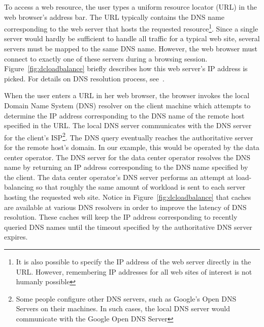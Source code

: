 To access a web resource, the user types a uniform resource locator (URL) in the web browser's address bar. The URL typically contains the DNS name corresponding to the web server that hosts the requested resource\footnote{It is also possible to specify the IP address of the web server directly in the URL. However, remembering IP addresses for all web sites of interest is not humanly possible}. Since a single server would hardly be sufficient to handle all traffic for a typical web site, several servers must be mapped to the same DNS name. However, the web browser must connect to exactly one of these servers during a browsing session. Figure~\ref{fig:dcloadbalance} briefly describes how this web server's IP address is picked. For details on DNS resolution process, see~\cite{rfc1034,rfc1035}. 

When the user enters a URL in her web browser, the browser invokes the local Domain Name System (DNS) resolver on the client machine which attempts to determine the IP address corresponding to the DNS name of the remote host specified in the URL. The local DNS server communicates with the DNS server for the client's ISP\footnote{Some people configure other DNS servers, such as Google's Open DNS Servers on their machines. In such cases, the local DNS server would communicate with the Google Open DNS Server}. The DNS query eventually reaches the authoritative server for the remote host's domain. In our example, this would be operated by the data center operator. The DNS server for the data center operator resolves the DNS name by returning an IP address corresponding to the DNS name specified by the client. The data center operator's DNS server performs an attempt at load-balancing so that roughly the same amount of workload is sent to each server hosting the requested web site. Notice in Figure~\ref{fig:dcloadbalance} that caches are available at various DNS resolvers in order to improve the latency of DNS resolution. These caches will keep the IP address corresponding to recently queried DNS names until the timeout specified by the authoritative DNS server expires.

